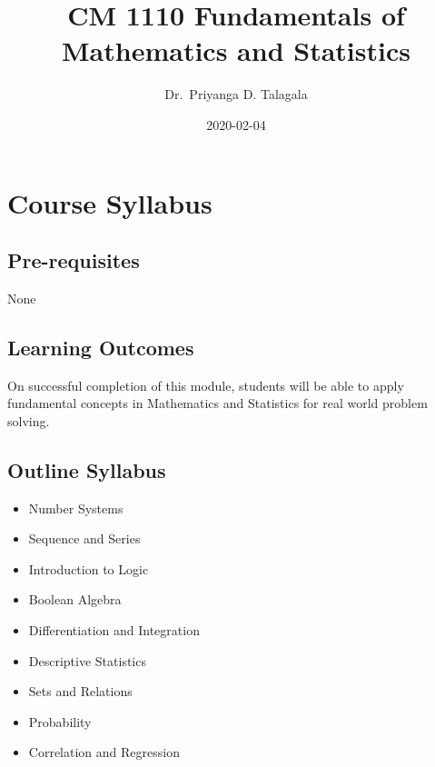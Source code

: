 \documentclass[]{book}
\title{CM 1110 Fundamentals of Mathematics and Statistics}
\author{Dr.~Priyanga D. Talagala}
\date{2020-02-04}
\providecommand{\tightlist}{%
  \setlength{\itemsep}{0pt}\setlength{\parskip}{0pt}}
\begin{document}
\maketitle

{
\setcounter{tocdepth}{1}
\tableofcontents
}
\hypertarget{course-syllabus}{%
\chapter*{Course Syllabus}\label{course-syllabus}}

\hypertarget{pre-requisites}{%
\section*{Pre-requisites}\label{pre-requisites}}

None

\hypertarget{learning-outcomes}{%
\section*{Learning Outcomes}\label{learning-outcomes}}

On successful completion of this module, students will be able to apply fundamental concepts in Mathematics and Statistics for real world problem solving.

\hypertarget{outline-syllabus}{%
\section*{Outline Syllabus}\label{outline-syllabus}}

\begin{itemize}
\tightlist
\item
  Number Systems
\item
  Sequence and Series
\item
  Introduction to Logic
\item
  Boolean Algebra
\item
  Differentiation and Integration
\item
  Descriptive Statistics
\item
  Sets and Relations
\item
  Probability
\item
  Correlation and Regression
\end{itemize}
\end{document}
